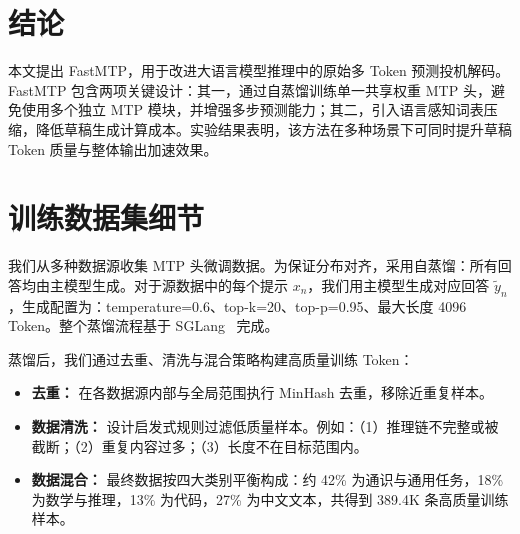 \documentclass{article} %
\begin{document}



\section{结论}

本文提出 FastMTP，用于改进大语言模型推理中的原始多 Token 预测投机解码。FastMTP 包含两项关键设计：其一，通过自蒸馏训练单一共享权重 MTP 头，避免使用多个独立 MTP 模块，并增强多步预测能力；其二，引入语言感知词表压缩，降低草稿生成计算成本。实验结果表明，该方法在多种场景下可同时提升草稿 Token 质量与整体输出加速效果。





\newpage

\appendix


\section{训练数据集细节} \label{app:train_data}

我们从多种数据源收集 MTP 头微调数据。为保证分布对齐，采用自蒸馏：所有回答均由主模型生成。对于源数据中的每个提示 $x_n$，我们用主模型生成对应回答 $\tilde{y}_n$，生成配置为：temperature=0.6、top-k=20、top-p=0.95、最大长度 4096 Token。整个蒸馏流程基于 SGLang~\citep{zheng2024sglang} 完成。

蒸馏后，我们通过去重、清洗与混合策略构建高质量训练 Token：
\begin{itemize}
    \item \textbf{去重：} 在各数据源内部与全局范围执行 MinHash 去重，移除近重复样本。

    \item \textbf{数据清洗：} 设计启发式规则过滤低质量样本。例如：（1）推理链不完整或被截断；（2）重复内容过多；（3）长度不在目标范围内。

    \item \textbf{数据混合：} 最终数据按四大类别平衡构成：约 42\% 为通识与通用任务，18\% 为数学与推理，13\% 为代码，27\% 为中文文本，共得到 389.4K 条高质量训练样本。
\end{itemize}
\end{document}
